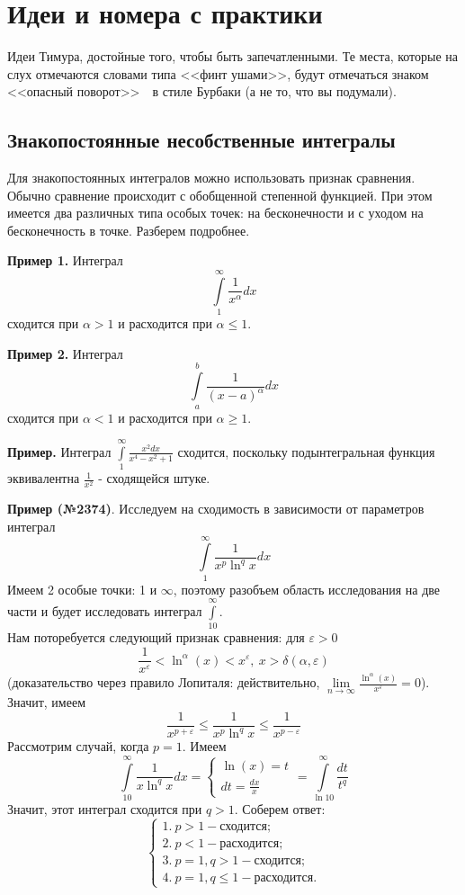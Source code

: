 \chapter{Идеи и номера с практики}
Идеи Тимура, достойные того, чтобы быть запечатленными.
Те места, которые на слух отмечаются словами типа <<финт ушами>>, будут 
отмечаться знаком <<опасный поворот>>~\dbend~в стиле Бурбаки (а не то, что
вы подумали). 

\section{Знакопостоянные несобственные интегралы}
Для знакопостоянных интегралов можно использовать признак сравнения.
Обычно сравнение происходит с обобщенной степенной функцией.
При этом имеется два различных типа особых точек: на бесконечности и 
с уходом на бесконечность в точке. Разберем подробнее.

\textbf{Пример 1.} Интеграл 
$$\int\limits_{1}^{\infty}\frac{1}{x^\alpha}dx$$ 
сходится при $\alpha>1$ и расходится при $\alpha\leqslant 1$.

\textbf{Пример 2.} Интеграл
$$\int\limits_{a}^{b}\frac{1}{(x-a)^\alpha}dx$$
сходится при $\alpha<1$ и расходится при $\alpha\geqslant 1$. 

\textbf{Пример.} Интеграл $\int\limits_{1}^{\infty} \frac{x^2dx}{x^4-x^2+1}$ 
сходится, поскольку подынтегральная функция эквивалентна $\frac{1}{x^2}$ - 
сходящейся штуке.


\textbf{Пример (№2374)}. Исследуем на сходимость в зависимости от параметров
интеграл
$$\int\limits_{1}^{\infty} \frac{1}{x^p\ln^q x}dx$$
Имеем 2 особые точки: 1 и $\infty$, поэтому разобъем область исследования
на две части и будет исследовать интеграл $\int\limits_{10}^{\infty}$.\\
Нам поторебуется следующий признак сравнения: для $\varepsilon>0$
$$\frac{1}{x^\varepsilon}<\ln^\alpha(x)<x^\varepsilon,~
x>\delta(\alpha,\varepsilon)$$ 
(доказательство через правило Лопиталя: действительно, 
$\lim\limits_{n \to \infty} \frac{\ln^\alpha(x)}{x^\varepsilon}=0$).\\
Значит, имеем
$$\frac{1}{x^{p+\varepsilon}}\leqslant \frac{1}{x^p\ln^qx}\leqslant 
\frac{1}{x^{p-\varepsilon}}$$ 
Рассмотрим случай, когда $p=1$. Имеем 
$$\int\limits_{10}^{\infty} \frac{1}{x\ln^qx}dx = 
\begin{cases}\ln(x)=t\\dt=\frac{dx}{x}\end{cases} = 
\int\limits_{\ln 10}^{\infty}\frac{dt}{t^q}$$ 
Значит, этот интеграл сходится при $q>1$.
Соберем ответ:
$$\begin{cases}
    1.~ p>1 - \text{сходится;}\\
    2.~ p<1 - \text{расходится;}\\
    3.~ p=1,q>1 - \text{сходится;}\\
    4.~ p=1,q\leqslant 1 - \text{расходится.}
\end{cases}$$



